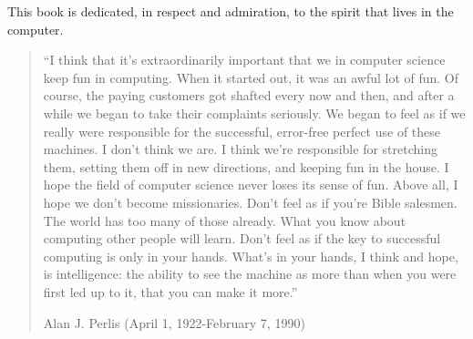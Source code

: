 \newpage
This book is dedicated, in respect and admiration, to the spirit that
lives in the computer.

\begin{quotation}
``I think that it's extraordinarily important that we in computer
science keep fun in computing.  When it started out, it was an awful
lot of fun.  Of course, the paying customers got shafted every now and
then, and after a while we began to take their complaints seriously.
We began to feel as if we really were responsible for the successful,
error-free perfect use of these machines.  I don't think we are.  I
think we're responsible for stretching them, setting them off in new
directions, and keeping fun in the house.  I hope the field of
computer science never loses its sense of fun.  Above all, I hope we
don't become missionaries.  Don't feel as if you're Bible salesmen.
The world has too many of those already.  What you know about
computing other people will learn.  Don't feel as if the key to
successful computing is only in your hands.  What's in your hands, I
think and hope, is intelligence: the ability to see the machine as
more than when you were first led up to it, that you can make it
more.''

Alan J. Perlis (April 1, 1922-February 7, 1990)
\end{quotation}

